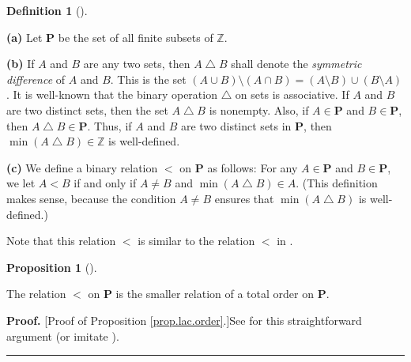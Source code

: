 \documentclass[numbers=enddot,12pt,final,onecolumn,notitlepage]{scrartcl}%
\theoremstyle{definition}
\newtheorem{prop}[theo]{Proposition}
\newenvironment{proposition}[1][]
{\begin{prop}[#1]\begin{leftbar}}
{\end{leftbar}\end{prop}}
\newtheorem{defi}[theo]{Definition}
\newenvironment{definition}[1][]
{\begin{defi}[#1]\begin{leftbar}}
{\end{leftbar}\end{defi}}
\newenvironment{proof}[1][Proof]{\noindent\textbf{#1.} }{\ \rule{0.5em}{0.5em}}
\newenvironment{vershort}{}{}
\begin{document}
\begin{definition}
\label{def.order-on-P}
\textbf{(a)} Let $\mathbf{P}$ be the set of all finite subsets of $\mathbb{Z}$.

\textbf{(b)} If $A$ and $B$ are any two sets, then $A\bigtriangleup B$ shall
denote the \textit{symmetric difference} of $A$ and $B$. This is the set
$\left(  A\cup B\right)  \setminus\left(  A\cap B\right)  =\left(  A\setminus
B\right)  \cup\left(  B\setminus A\right)  $. It is well-known that the binary
operation $\bigtriangleup$ on sets is associative. If $A$ and $B$ are two
distinct sets, then the set $A\bigtriangleup B$ is nonempty. Also, if
$A\in\mathbf{P}$ and $B\in\mathbf{P}$, then $A\bigtriangleup B\in\mathbf{P}$.
Thus, if $A$ and $B$ are two distinct sets in $\mathbf{P}$, then $\min\left(
A\bigtriangleup B\right)  \in\mathbb{Z}$ is well-defined.

\textbf{(c)} We define a binary relation $<$ on $\mathbf{P}$ as follows: For
any $A\in\mathbf{P}$ and $B\in\mathbf{P}$, we let $A<B$ if and only if $A\neq
B$ and $\min\left(  A\bigtriangleup B\right)  \in A$. (This definition makes
sense, because the condition $A\neq B$ ensures that $\min\left(
A\bigtriangleup B\right)  $ is well-defined.)
\end{definition}

Note that this relation $<$ is similar to the relation $<$ in \cite[Lemma
4.3]{ABN-peaks}.

\begin{proposition}
\label{prop.lac.order}The relation $<$ on $\mathbf{P}$ is the smaller relation
of a total order on $\mathbf{P}$.
\end{proposition}

\begin{vershort}


\begin{proof}
[Proof of Proposition \ref{prop.lac.order}.]See \cite{verlong} for this
straightforward argument (or imitate \cite[proof of Lemma 4.3]{ABN-peaks}).
\end{proof}
\end{vershort}
\end{document}
